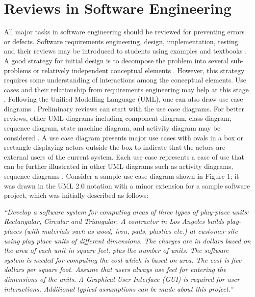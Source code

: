 \documentclass{article}
\begin{document}
\section{Reviews in Software Engineering}
All major tasks in software engineering should be reviewed for preventing errors or defects.   Software requirements engineering, design, implementation, testing and their reviews may be introduced to students using examples and textbooks \cite{kung, pressman}.  A good strategy for initial design is to decompose the problem into several sub-problems or relatively independent conceptual elements \cite{ouster}. However, this strategy requires some understanding of interactions among the conceptual elements. Use cases and their relationship from requirements engineering may help at this stage \cite{pressman, rumbaugh}. Following the Unified Modelling Language (UML), one can also draw use case diagrams \cite{pressman, rumbaugh}.  Preliminary reviews can start with the use case diagrams.  For better reviews, other UML diagrams including component diagram, class diagram, sequence diagram, state machine diagram, and activity diagram may be considered \cite{pressman, rumbaugh}. A use case diagram presents major use cases with ovals in a box or rectangle displaying actors outside the box to indicate that the actors are external users of the current system. Each use case represents a case of use that can be further illustrated in other UML diagrams such as activity diagrams, sequence diagrams \cite{pressman, rumbaugh}.  Consider a sample use case diagram shown in Figure 1; it was drawn in the UML 2.0 notation with a minor extension for a sample software project, which was initially described as follows:  

 \emph{``Develop a software system for computing areas of three types of play-place units: Rectangular, Circular and Triangular. A contractor in Los Angeles builds play-places (with materials such as wood, iron, pads, plastics etc.) at customer site using play place units of different dimensions. The charges are in dollars based on the area of each unit 
in square feet, plus the number of units. The software system is needed for computing the cost which is based on area. 
The cost is five dollars per square foot. Assume that users always use feet for entering the dimensions of the units. A Graphical User Interface (GUI) is required for user interactions. Additional typical assumptions can be made about this project.''} 
\end{document}
